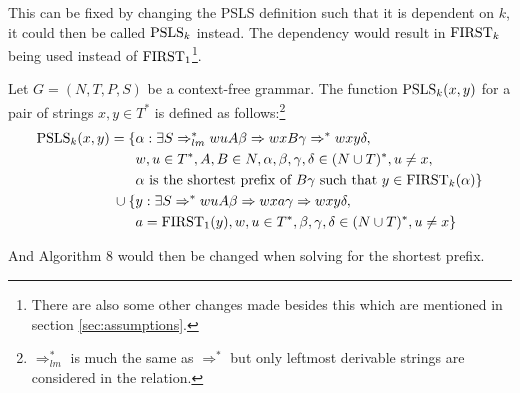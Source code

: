 This can be fixed by changing the PSLS definition such that it is dependent on $k$, it could then be called $\PSLS_k$ instead. The dependency would result in $\text{FIRST}_k$ being used instead of $\text{FIRST}_1$\footnote{There are also some other changes made besides this which are mentioned in section \ref{sec:assumptions}.}.
\begin{definition}[$\PSLS_k$]
    Let $G = (N, T, P, S)$ be a context-free grammar. The function $\text{PSLS}_k(x, y)$ for a pair of strings $x, y \in T^*$ is defined as follows:\footnote{$\Rightarrow_{lm}^*$ is much the same as $\Rightarrow^*$ but only leftmost derivable strings are considered in the relation.}
    \begin{align*}
        \text{PSLS}_k(x, y) = \{ & \alpha : \exists S \Rightarrow^*_{lm} wuA\beta \Rightarrow wxB\gamma \Rightarrow^* wxy\delta, \\
        & w, u \in T^*, A, B \in N, \alpha, \beta, \gamma, \delta \in (N \cup T)^*, u \neq x, \\
        & \alpha \text{ is the shortest prefix of } B\gamma \text{ such that } y \in \text{FIRST}_k(\alpha) \} \\
        \cup \: \{ & y : \exists S \Rightarrow^* wuA\beta \Rightarrow wxa\gamma \Rightarrow wxy\delta, \\
        & a = \text{FIRST}_1(y), w,u \in T^*, \beta, \gamma, \delta \in (N \cup T)^*, u \neq x \}
    \end{align*}
\end{definition}
\noindent And Algorithm 8 would then be changed when solving for the shortest prefix.
